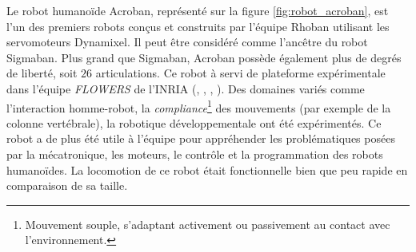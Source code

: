 Le robot humanoïde Acroban, représenté sur la 
figure \ref{fig:robot_acroban}, est l'un des premiers robots 
conçus et construits par l'équipe Rhoban utilisant 
les servomoteurs Dynamixel.
Il peut être considéré comme l'ancêtre du robot Sigmaban.
Plus grand que Sigmaban, Acroban possède également plus de degrés de liberté, 
soit $26$ articulations. 
Ce robot à servi de plateforme expérimentale dans l'équipe 
\textit{FLOWERS} de l'INRIA 
(\cite{ly_acroban_2010}, \cite{lapeyre_maturational_2011},
\cite{ly_bio-inspired_2011}, \cite{oudeyer_exploring_2011}).
Des domaines variés comme l'interaction homme-robot, 
la \textit{compliance}\footnote{Mouvement souple, s'adaptant 
activement ou passivement au contact avec l'environnement.}
des mouvements (par exemple de la colonne vertébrale),
la robotique développementale ont été expérimentés.
Ce robot a de plus été utile à l'équipe pour appréhender les problématiques
posées par la mécatronique, les moteurs, le contrôle 
et la programmation des robots humanoïdes.
La locomotion de ce robot était fonctionnelle bien que peu rapide
en comparaison de sa taille.\\

